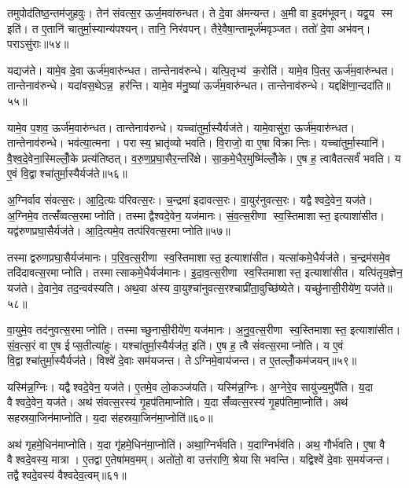 तमुपोद॑तिष्ठ॒न्तम॑जुहवुः। तेन॑ संवत्स॒र ऊर्ज॒मवा॑रुन्धत। ते दे॒वा अ॑मन्यन्त। अ॒मी वा इ॒दम॑भूवन्। यद्व॒य स्म इति॑। त ए॒तानि॑ चातुर्मा॒स्यान्य॑पश्यन्। तानि॒ निर॑वपन्। तैरे॒वैषा॒न्तामूर्ज॑मवृञ्जत। ततो॑ दे॒वा अभ॑वन्। पराऽसु॑राः॥५४॥

यद्यज॑ते। यामे॒व दे॒वा ऊर्ज॑म॒वारु॑न्धत। तान्तेनाव॑रुन्धे। यत्पि॒तृभ्य॑ क॒रोति॑। यामे॒व पि॒तर॒ ऊर्ज॑म॒वारु॑न्धत। तान्तेनाव॑रुन्धे। यदा॑वस॒थेऽन्न॒ हर॑न्ति। यामे॒व म॑नु॒ष्या॑ ऊर्ज॑म॒वारु॑न्धत। तान्तेनाव॑रुन्धे। यद्दक्षि॑णा॒न्ददा॑ति॥५५॥

यामे॒व प॒शव॒ ऊर्ज॑म॒वारु॑न्धत। तान्तेनाव॑रुन्धे। यच्चा॑तुर्मा॒स्यैर्यज॑ते। यामे॒वासु॑रा॒ ऊर्ज॑म॒वारु॑न्धत। तान्तेनाव॑रुन्धे। भव॑त्या॒त्मना। परास्य॒ भ्रातृ॑व्यो भवति। वि॒राजो॒ वा ए॒षा विक्रान्तिः। यच्चा॑तुर्मा॒स्यानि॑। वै॒श्व॒दे॒वेना॒स्मिल्लोँ॒के प्रत्य॑तिष्ठत्। व॒रु॒ण॒प्र॒घा॒सैर॒न्तरि॑क्षे। सा॒क॒मे॒धैर॒मुष्मि॑ल्लोँ॒के। ए॒ष ह॒ त्वावैतत्सर्वं॑ भवति। य ए॒वं वि॒द्वाश्चा॑तुर्मा॒स्यैर्यज॑ते॥५६॥

अ॒ग्निर्वाव सं॑वत्स॒रः। आ॒दि॒त्यः प॑रिवत्स॒रः। च॒न्द्रमा॑ इदावत्स॒रः। वा॒युर॑नुवत्स॒रः। यद्वैश्वदे॒वेन॒ यज॑ते। अ॒ग्निमे॒व तत्सँ॑व्वत्स॒रमाप्नोति। तस्माद्वैश्वदे॒वेन॒ यज॑मानः। सं॒व॒त्स॒रीणा स्व॒स्तिमाशास्त॒ इत्याशा॑सीत। यद्व॑रुण\-प्रघा॒सैर्यज॑ते। आ॒दि॒त्यमे॒व तत्प॑रिवत्स॒रमाप्नोति॥५७॥

तस्माद्वरुणप्रघा॒सैर्यज॑मानः। प॒रि॒व॒त्स॒रीणा स्व॒स्तिमाशास्त॒ इत्याशा॑सीत। यत्सा॑कमे॒धैर्यज॑ते। च॒न्द्रम॑समे॒व तदि॑दावत्स॒र\-माप्नोति। तस्मात्साकमे॒धैर्यज॑मानः। इ॒दा॒व॒त्स॒रीणा स्व॒स्तिमाशास्त॒ इत्याशा॑सीत। यत्पि॑तृय॒ज्ञेन॒ यज॑ते। दे॒वाने॒व तद॒न्वव॑स्यति। अथ॒वा अ॑स्य वा॒युश्चा॑नुवत्स॒रश्चाप्री॑ता॒\-वुच्छि॑ष्येते। यच्छु॑नासी॒रीये॑ण॒ यज॑ते॥५८॥

वा॒युमे॒व तद॑नुवत्स॒रमाप्नोति। तस्माच्छुनासी॒रीये॑ण॒ यज॑मानः। अ॒नु॒व॒त्स॒रीणा स्व॒स्तिमाशास्त॒ इत्याशा॑सीत। सं॒व॒त्स॒रं वा ए॒ष ईप्स॒तीत्या॑हुः। यश्चा॑तुर्मा॒स्यैर्यज॑त॒ इति॑। ए॒ष ह॒ त्वै सं॑वत्स॒रमाप्नोति। य ए॒वं वि॒द्वाश्चा॑तुर्मा॒स्यैर्यज॑ते। विश्वे॑ दे॒वाः सम॑यजन्त। तेऽग्निमे॒वाय॑जन्त। त ए॒तल्लोँ॒कम॑जयन्॥५९॥

यस्मि॑न्न॒ग्निः। यद्वैश्वदे॒वेन॒ यज॑ते। ए॒तमे॒व लो॒कञ्ज॑यति। यस्मि॑न्न॒ग्निः। अ॒ग्नेरे॒व सायु॑ज्य॒मुपै॑ति। य॒दा वैश्वदे॒वेन॒ यज॑ते। अथ॑ संवत्स॒रस्य॑ गृ॒हप॑तिमाप्नोति। य॒दा सँ॑व्वत्स॒रस्य॑ गृ॒हप॑तिमा॒प्नोति॑। अथ॑ सहस्रया॒जिन॑माप्नोति। य॒दा स॑हस्रया॒जिन॑मा॒प्नोति॑॥६०॥

अथ॑ गृहमे॒धिन॑माप्नोति। य॒दा गृ॑हमे॒धिन॑मा॒प्नोति॑। अथा॒ग्निर्भ॑वति। य॒दाग्निर्भव॑ति। अथ॒ गौर्भ॑वति। ए॒षा वै वैश्वदे॒वस्य॒ मात्रा। ए॒तद्वा ए॒तेषा॑मव॒मम्। अतो॑तो॒ वा उत्त॑राणि॒ श्रेयासि भवन्ति। यद्विश्वे॑ दे॒वाः स॒मय॑जन्त। तद्वैश्वदे॒वस्य॑ वैश्वदेव॒त्वम्॥६१॥

